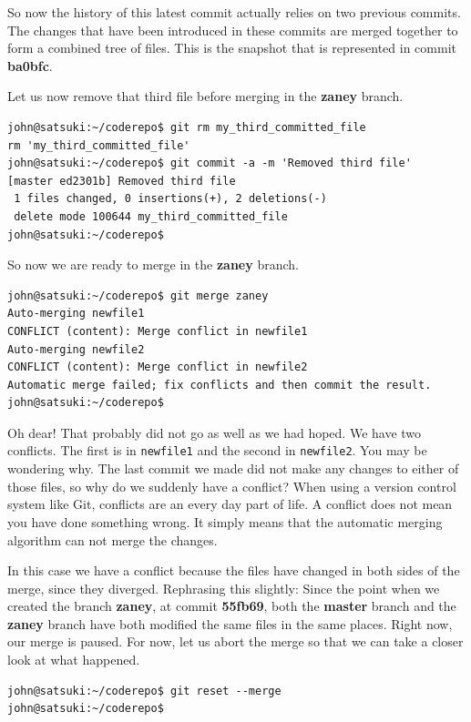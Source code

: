 So now the history of this latest commit actually relies on two previous commits.  The changes that have been introduced in these commits are merged together to form a combined tree of files.  This is the snapshot that is represented in commit \textbf{ba0bfc}.

Let us now remove that third file before merging in the \textbf{zaney} branch.

\begin{Verbatim}
john@satsuki:~/coderepo$ git rm my_third_committed_file
rm 'my_third_committed_file'
john@satsuki:~/coderepo$ git commit -a -m 'Removed third file'
[master ed2301b] Removed third file
 1 files changed, 0 insertions(+), 2 deletions(-)
 delete mode 100644 my_third_committed_file
john@satsuki:~/coderepo$ 
\end{Verbatim}

So now we are ready to merge in the \textbf{zaney} branch.

\begin{Verbatim}
john@satsuki:~/coderepo$ git merge zaney
Auto-merging newfile1
CONFLICT (content): Merge conflict in newfile1
Auto-merging newfile2
CONFLICT (content): Merge conflict in newfile2
Automatic merge failed; fix conflicts and then commit the result.
john@satsuki:~/coderepo$ 
\end{Verbatim}

Oh dear!  That probably did not go as well as we had hoped.  We have two conflicts.  The first is in \texttt{newfile1} and the second in \texttt{newfile2}.  You may be wondering why.  The last commit we made did not make any changes to either of those files, so why do we suddenly have a conflict?  When using a version control system like Git, conflicts are an every day part of life.  A conflict does not mean you have done something wrong.  It simply means that the automatic merging algorithm can not merge the changes.

In this case we have a conflict because the files have changed in both sides of the merge, since they diverged.  Rephrasing this slightly: Since the point when we created the branch \textbf{zaney}, at commit \textbf{55fb69}, both the \textbf{master} branch and the \textbf{zaney} branch have both modified the same files in the same places.  Right now, our merge is paused.  For now, let us abort the merge so that we can take a closer look at what happened.

\begin{Verbatim}
john@satsuki:~/coderepo$ git reset --merge
john@satsuki:~/coderepo$ 
\end{Verbatim}

